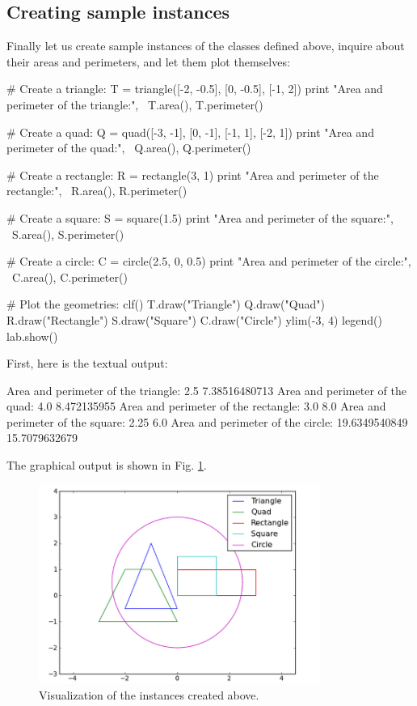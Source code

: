\subsection{Creating sample instances}

Finally let us create sample instances of the classes defined above, inquire
about their areas and perimeters, and let them plot themselves:

\begin{bluecode}
# Create a triangle:
T = triangle([-2, -0.5], [0, -0.5], [-1, 2])
print "Area and perimeter of the triangle:", \
T.area(), T.perimeter()

# Create a quad:
Q = quad([-3, -1], [0, -1], [-1, 1], [-2, 1])
print "Area and perimeter of the quad:", \
Q.area(), Q.perimeter()
 
# Create a rectangle:
R = rectangle(3, 1)
print "Area and perimeter of the rectangle:", \
R.area(), R.perimeter()

# Create a square:
S = square(1.5)
print "Area and perimeter of the square:", \
S.area(), S.perimeter()
 
# Create a circle:
C = circle(2.5, 0, 0.5)
print "Area and perimeter of the circle:", \
C.area(), C.perimeter()

# Plot the geometries:
clf()
T.draw("Triangle")
Q.draw("Quad")
R.draw("Rectangle")
S.draw("Square")
C.draw("Circle")
ylim(-3, 4)
legend()
lab.show()
\end{bluecode}
First, here is the textual output:

\begin{greencode}
Area and perimeter of the triangle: 2.5 7.38516480713
Area and perimeter of the quad: 4.0 8.472135955
Area and perimeter of the rectangle: 3.0 8.0
Area and perimeter of the square: 2.25 6.0
Area and perimeter of the circle: 19.6349540849 15.7079632679
\end{greencode}
The graphical output is shown in Fig. \ref{fig:classes2}.

\begin{figure}[!ht]
\begin{center}
\includegraphics[width=0.82\textwidth]{imgp/classes2.png}
\end{center}
\vspace{-2mm}
\caption{Visualization of the instances created above.}
\label{fig:classes2}
\end{figure}


